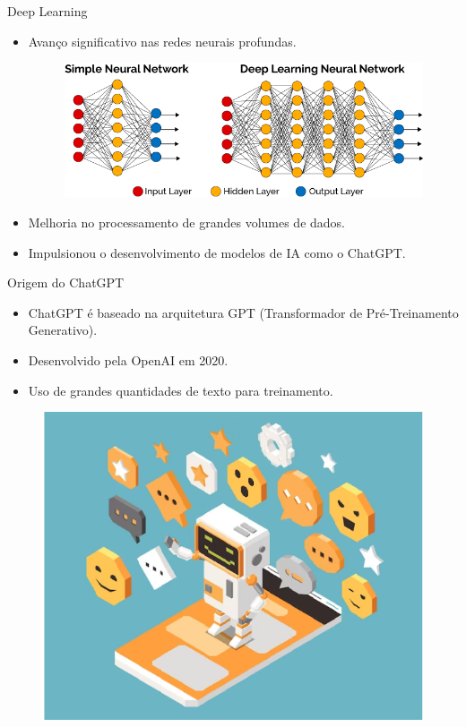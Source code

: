 \documentclass{beamer}
\begin{document}
\begin{frame}{Deep Learning}
\begin{itemize}
\item Avanço significativo nas redes neurais profundas.
\begin{figure}
    \centering
    \includegraphics[scale=0.4]{figuras/neural.png}
\end{figure}
\item Melhoria no processamento de grandes volumes de dados.
\item Impulsionou o desenvolvimento de modelos de IA como o ChatGPT.
\end{itemize}
\end{frame}


\begin{frame}{Origem do ChatGPT}
\begin{itemize}
\item ChatGPT é baseado na arquitetura GPT (Transformador de Pré-Treinamento Generativo).
\item Desenvolvido pela OpenAI em 2020.
\item Uso de grandes quantidades de texto para treinamento.
\end{itemize}
\begin{figure}
    \centering
    \includegraphics[scale=0.4]{figuras/chatboot.png}
\end{figure}
\end{frame}
\end{document}
